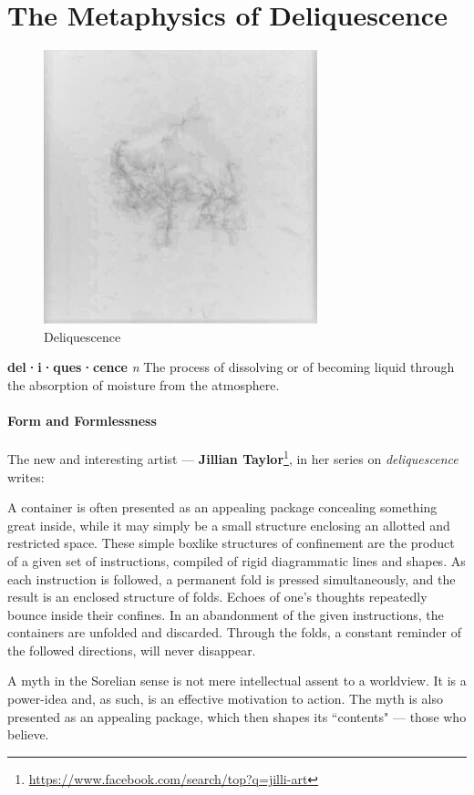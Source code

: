 \section{The Metaphysics of Deliquescence}

\begin{figure}
 \includegraphics[scale=.5]{a20060629TheMetaphysicsofDeliquescence-img001.jpg} 
\caption{Deliquescence}
\end{figure} 

\textbf{del·i·ques·cence} \emph{n} The process of dissolving or of becoming liquid through the absorption of moisture from the atmosphere.

\paragraph{Form and Formlessness}
The new and interesting artist — \textbf{Jillian Taylor}\footnote{\url{https://www.facebook.com/search/top?q=jilli-art}}, in her series on \emph{deliquescence} writes:

\begin{quotex}
A container is often presented as an appealing package concealing something great inside, while it may simply be a small structure enclosing an allotted and restricted space. These simple boxlike structures of confinement are the product of a given set of instructions, compiled of rigid diagrammatic lines and shapes. As each instruction is followed, a permanent fold is pressed simultaneously, and the result is an enclosed structure of folds. Echoes of one's thoughts repeatedly bounce inside their confines. In an abandonment of the given instructions, the containers are unfolded and discarded. Through the folds, a constant reminder of the followed directions, will never disappear. 

\end{quotex}
A myth in the Sorelian sense is not mere intellectual assent to a worldview. It is a power-idea and, as such, is an effective motivation to action. The myth is also presented as an appealing package, which then shapes its ``contents" — those who believe.

